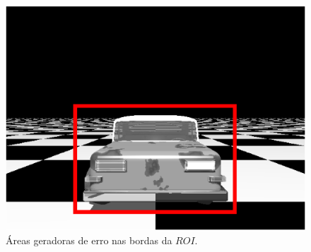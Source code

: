 \begin{figure}[H]
\includegraphics[width=\columnwidth]{images/imageError.eps}
\caption{Áreas geradoras de erro nas bordas da $ROI$.}
\label{fig:erroridentified}
\end{figure}

